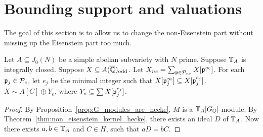\documentclass[thesis.tex]{subfiles}
\begin{document}
\section{Bounding support and valuations}%
\label{sec:bounding_support_and_valuations}

The goal of this section is to allow us to change the non-Eisenstein part
without missing up the Eisenstein part too much.


\begin{proposition}
    Let $A\subseteq J_0(N)$ be a simple abelian subvariety with $N$ prime.
    Suppose $\mathbb{T}_A$ is integrally closed. Suppose $X\subseteq A(\overline{\mathbb{Q}})_{\mathrm{odd}}$.
    Let $X_{ne} = \sum_{\mathfrak{p} \in \mathcal{P}_{ne}} X[\mathfrak{p}^\infty]$. For each $\mathfrak{p}_j\in \mathcal{P}_e$,
    let $e_j$ be the minimal integer such that $X[\mathfrak{p}_j ^\infty]\subseteq X[\mathfrak{p}_j
    ^{e_j}]$. $X\sim A[C]\oplus Y_e$, where $Y_e\subseteq \sum X[\mathfrak{p}_j ^{e_j}]$.
\end{proposition}
\begin{proof}
    By Proposition~\ref{prop:G_modules_are_hecke}, $M$ is a
    $\mathbb{T}_A[G_{\mathbb{Q}}]$-module. By Theorem~\ref{thm:non_eisenstein_kernel_hecke},
    there exists an ideal $D$ of $\mathbb{T}_A$. Now there exists $a,b\in \mathbb{T}_A$ and
    $C\in H$, such that $aD=bC$.
\end{proof}
\end{document}

